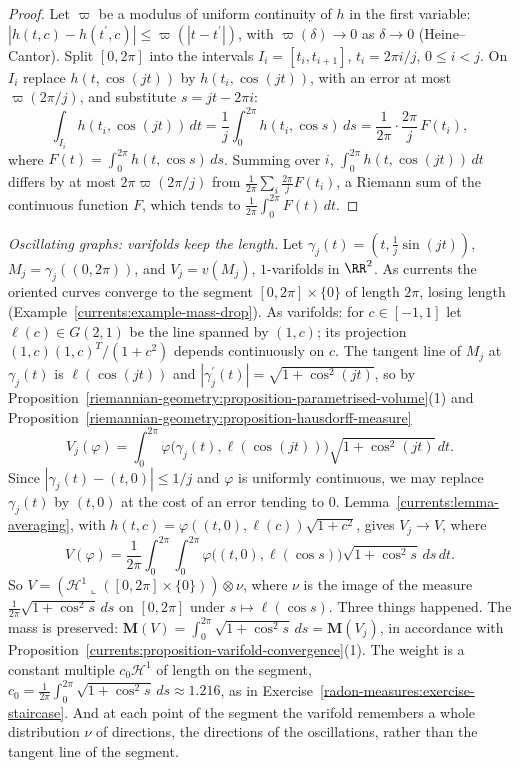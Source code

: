 \begin{proof}
Let $\varpi$ be a modulus of uniform continuity of $h$ in the first variable: $|h(t, c) - h(t^{\prime}, c)| \leq \varpi(|t - t^{\prime}|)$, with $\varpi(\delta) \to 0$ as $\delta \to 0$ (Heine--Cantor). Split
$[0, 2\pi]$ into the intervals $I_i = [t_i, t_{i+1}]$, $t_i = 2\pi i/j$, $0 \leq i < j$. On $I_i$ replace $h(t, \cos(jt))$ by $h(t_i, \cos(jt))$, with an error at most $\varpi(2\pi/j)$, and substitute
$s = jt - 2\pi i$:
\[
\int_{I_i}h(t_i, \cos(jt))\,dt = \frac1j\int_0^{2\pi}h(t_i, \cos s)\,ds = \frac1{2\pi}\cdot\frac{2\pi}j\,F(t_i),
\]
where $F(t) = \int_0^{2\pi}h(t, \cos s)\,ds$.
Summing over $i$, $\int_0^{2\pi}h(t, \cos(jt))\,dt$ differs by at most $2\pi\varpi(2\pi/j)$ from $\frac1{2\pi}\sum_i\frac{2\pi}jF(t_i)$, a Riemann sum of the continuous function $F$, which tends to
$\frac1{2\pi}\int_0^{2\pi}F(t)\,dt$.
\end{proof}

\begin{example}\label{currents:example-oscillating}
\emph{Oscillating graphs: varifolds keep the length.} Let $\gamma_j(t) = (t, \frac1j\sin(jt))$, $M_j = \gamma_j((0, 2\pi))$, and $V_j = v(M_j)$, $1$-varifolds in $\RR^2$. As currents the oriented curves
converge to the segment $[0, 2\pi] \times \{0\}$ of length $2\pi$, losing length (Example~\ref{currents:example-mass-drop}). As varifolds: for $c \in [-1, 1]$ let $\ell(c) \in G(2, 1)$ be the line spanned by
$(1, c)$; its projection $(1, c)(1, c)^T/(1 + c^2)$ depends continuously on $c$. The tangent line of $M_j$ at $\gamma_j(t)$ is $\ell(\cos(jt))$ and $|\gamma_j^{\prime}(t)| = \sqrt{1 + \cos^2(jt)}$, so by
Proposition~\ref{riemannian-geometry:proposition-parametrised-volume}(1) and Proposition~\ref{riemannian-geometry:proposition-hausdorff-measure}
\[
V_j(\varphi) = \int_0^{2\pi}\varphi\bigl(\gamma_j(t), \ell(\cos(jt))\bigr)\sqrt{1 + \cos^2(jt)}\,dt .
\]
Since $|\gamma_j(t) - (t, 0)| \leq 1/j$ and $\varphi$ is uniformly continuous, we may replace $\gamma_j(t)$ by $(t, 0)$ at the cost of an error tending to $0$. Lemma~\ref{currents:lemma-averaging}, with
$h(t, c) = \varphi((t, 0), \ell(c))\sqrt{1 + c^2}$, gives $V_j \to V$, where
\[
V(\varphi) = \frac1{2\pi}\int_0^{2\pi}\int_0^{2\pi}\varphi\bigl((t, 0), \ell(\cos s)\bigr)\sqrt{1 + \cos^2s}\,ds\,dt .
\]
So $V = (\mathcal{H}^1\llcorner([0, 2\pi] \times \{0\})) \otimes \nu$, where $\nu$ is the image of the measure $\frac1{2\pi}\sqrt{1 + \cos^2s}\,ds$ on $[0, 2\pi]$ under $s \mapsto \ell(\cos s)$. Three things
happened. The mass is preserved: $\mathbf{M}(V) = \int_0^{2\pi}\sqrt{1 + \cos^2s}\,ds = \mathbf{M}(V_j)$, in accordance with Proposition~\ref{currents:proposition-varifold-convergence}(1). The weight is a
constant multiple $c_0\mathcal{H}^1$ of length on the segment, $c_0 = \frac1{2\pi}\int_0^{2\pi}\sqrt{1 + \cos^2s}\,ds \approx 1.216$, as in Exercise~\ref{radon-measures:exercise-staircase}. And at each point of
the segment the varifold remembers a whole distribution $\nu$ of directions, the directions of the oscillations, rather than the tangent line of the segment.
\end{example}

